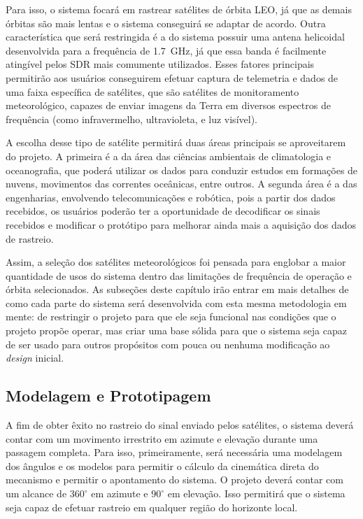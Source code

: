 Para isso, o sistema focará em rastrear satélites de órbita LEO, já que as demais órbitas são mais lentas e o sistema conseguirá se adaptar de acordo.
Outra característica que será restringida é a do sistema possuir uma antena helicoidal desenvolvida para a frequência de \SI{1,7}{\giga\hertz}, já que essa banda é facilmente atingível pelos SDR mais comumente utilizados.
Esses fatores principais permitirão aos usuários conseguirem efetuar captura de telemetria e dados de uma faixa específica de satélites, que são satélites de monitoramento meteorológico, capazes de enviar imagens da Terra em diversos espectros de frequência (como infravermelho, ultravioleta, e luz visível).

A escolha desse tipo de satélite permitirá duas áreas principais se aproveitarem do projeto.
A primeira é a da área das ciências ambientais de climatologia e oceanografia, que poderá utilizar os dados para conduzir estudos em formações de nuvens, movimentos das correntes oceânicas, entre outros.
A segunda área é a das engenharias, envolvendo telecomunicações e robótica, pois a partir dos dados recebidos, os usuários poderão ter a oportunidade de decodificar os sinais recebidos e modificar o protótipo para melhorar ainda mais a aquisição dos dados de rastreio.

Assim, a seleção dos satélites meteorológicos foi pensada para englobar a maior quantidade de usos do sistema dentro das limitações de frequência de operação e órbita selecionados.
As subseções deste capítulo irão entrar em mais detalhes de como cada parte do sistema será desenvolvida com esta mesma metodologia em mente: de restringir o projeto para que ele seja funcional nas condições que o projeto propõe operar, mas criar uma base sólida para que o sistema seja capaz de ser usado para outros propósitos com pouca ou nenhuma modificação ao \textit{design} inicial.

\subsection{Modelagem e Prototipagem}
A fim de obter êxito no rastreio do sinal enviado pelos satélites, o sistema deverá contar com um movimento irrestrito em azimute e elevação durante uma passagem completa.
Para isso, primeiramente, será necessária uma modelagem dos ângulos e os modelos para permitir o cálculo da cinemática
direta do mecanismo e permitir o apontamento do sistema. O projeto deverá contar com um alcance de $360^\circ$ em azimute e $90^\circ$ em elevação.
Isso permitirá que o sistema seja capaz de efetuar rastreio em qualquer região do horizonte local.

